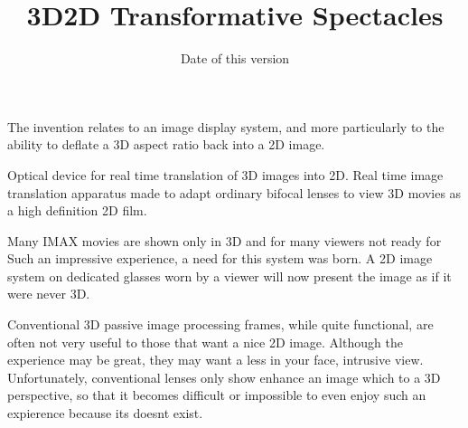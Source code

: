 \documentclass[english]{uspatent}
\begin{document}
\setPrintingModeApplication

%

\title{3D2D Transformative Spectacles}
\date{Date of this version}

\maketitle


\patentParagraph The invention relates to an image display system, and more particularly to the ability to  deflate a 3D aspect ratio back into a 2D image. 

\patentParagraph Optical device for real time translation of 3D images into 2D. 
Real time image translation apparatus made to adapt ordinary bifocal lenses 
to view 3D movies as a high definition 2D film. 




\patentParagraph Many IMAX movies are shown only in 3D and for many viewers not ready for 
Such an impressive experience, a need for this system was born. A 2D image system
on dedicated glasses worn by a viewer will now present the image as if it were never
3D. 

\patentParagraph Conventional 3D passive image processing frames, while quite functional, are often not very useful to those that want a nice 2D image. Although the experience may be great, they may want a less in your face, intrusive view. Unfortunately, conventional lenses only show
enhance an image which to a 3D perspective, so that it becomes difficult or impossible to even enjoy such an expierence because its doesnt exist. 


\end{document}
